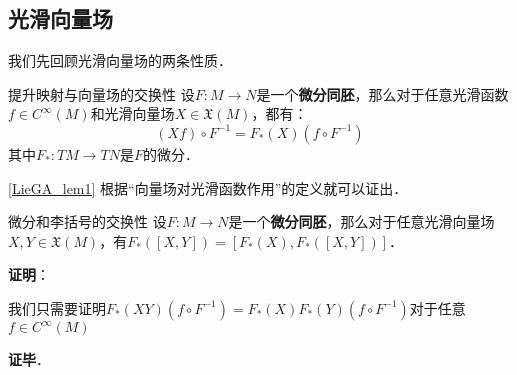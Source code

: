 

\subsection{光滑向量场}

我们先回顾光滑向量场的两条性质．

\begin{lemma}{提升映射与向量场的交换性}\label{LieGA_lem1}
设$F:M\to N$是一个\textbf{微分同胚}，那么对于任意光滑函数$f\in C^{\infty}(M)$和光滑向量场$X\in\mathfrak{X}(M)$，都有：
\begin{equation}
(Xf)\circ F^{-1}=F_*(X)(f\circ F^{-1})
\end{equation}
其中$F_*:TM\to TN$是$F$的微分．
\end{lemma}

\autoref{LieGA_lem1} 根据“向量场对光滑函数作用”的定义就可以证出．

\begin{lemma}{微分和李括号的交换性}
设$F:M\to N$是一个\textbf{微分同胚}，那么对于任意光滑向量场$X, Y\in\mathfrak{X}(M)$，有$F_*([X, Y])=[F_*(X), F_*([X, Y])]$．
\end{lemma}

\textbf{证明}：

我们只需要证明$F_*(XY)(f\circ F^{-1})=F_*(X)F_*(Y)(f\circ F^{-1})$对于任意$f\in C^{\infty}(M)$

\textbf{证毕}．




